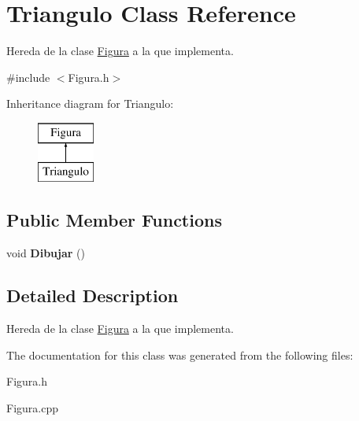 \hypertarget{class_triangulo}{\section{Triangulo Class Reference}
\label{class_triangulo}
}


Hereda de la clase \hyperlink{class_figura}{Figura} a la que implementa.  




{\ttfamily \#include $<$Figura.\-h$>$}

Inheritance diagram for Triangulo\-:\begin{figure}[H]
\begin{center}
\leavevmode
\includegraphics[height=2.000000cm]{class_triangulo}
\end{center}
\end{figure}
\subsection*{Public Member Functions}
\begin{DoxyCompactItemize}
\item 
\hypertarget{class_triangulo_a5acc44ddc934e0abc46c77d97c9ce3a6}{void {\bfseries Dibujar} ()}\label{class_triangulo_a5acc44ddc934e0abc46c77d97c9ce3a6}

\end{DoxyCompactItemize}


\subsection{Detailed Description}
Hereda de la clase \hyperlink{class_figura}{Figura} a la que implementa. 

The documentation for this class was generated from the following files\-:\begin{DoxyCompactItemize}
\item 
Figura.\-h\item 
Figura.\-cpp\end{DoxyCompactItemize}

